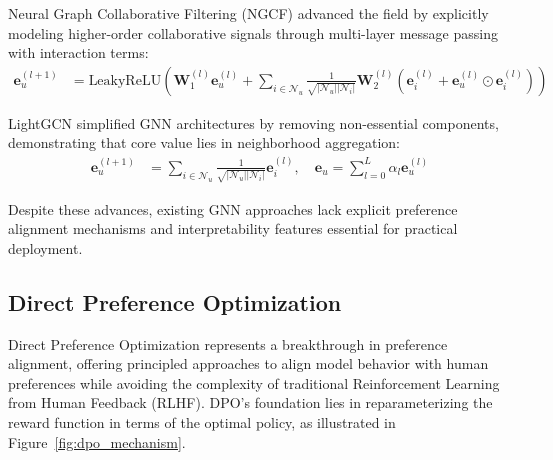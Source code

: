 \documentclass[pdflatex,sn-mathphys-num]{sn-jnl}%
\theoremstyle{thmstyleone}%
\theoremstyle{thmstyletwo}%
\theoremstyle{thmstylethree}%
\begin{document}
Neural Graph Collaborative Filtering (NGCF) \cite{wang2019neural} advanced the field by explicitly modeling higher-order collaborative signals through multi-layer message passing with interaction terms:
\begin{align}
\mathbf{e}_u^{(l+1)} &= \text{LeakyReLU}(\mathbf{W}_1^{(l)}\mathbf{e}_u^{(l)} + \sum_{i \in \mathcal{N}_u} \frac{1}{\sqrt{|\mathcal{N}_u||\mathcal{N}_i|}} \mathbf{W}_2^{(l)}(\mathbf{e}_i^{(l)} + \mathbf{e}_u^{(l)} \odot \mathbf{e}_i^{(l)}))
\end{align}

LightGCN \cite{he2020lightgcn} simplified GNN architectures by removing non-essential components, demonstrating that core value lies in neighborhood aggregation:
\begin{align}
\mathbf{e}_u^{(l+1)} &= \sum_{i \in \mathcal{N}_u} \frac{1}{\sqrt{|\mathcal{N}_u||\mathcal{N}_i|}} \mathbf{e}_i^{(l)}, \quad \mathbf{e}_u = \sum_{l=0}^{L} \alpha_l \mathbf{e}_u^{(l)}
\end{align}

Despite these advances, existing GNN approaches lack explicit preference alignment mechanisms and interpretability features essential for practical deployment.

\subsection{Direct Preference Optimization}

Direct Preference Optimization represents a breakthrough in preference alignment, offering principled approaches to align model behavior with human preferences while avoiding the complexity of traditional Reinforcement Learning from Human Feedback (RLHF). DPO's foundation lies in reparameterizing the reward function in terms of the optimal policy, as illustrated in Figure~\ref{fig:dpo_mechanism}.
\end{document}
